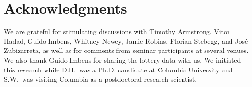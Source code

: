 \documentclass[aos,submission]{imsart}
\theoremstyle{plain}
\theoremstyle{remark}
\begin{document}
\section*{Acknowledgments}

We are grateful for stimulating
discussions with Timothy Armstrong, Vitor Hadad, Guido Imbens, Whitney Newey, Jamie Robins, Florian Stebegg, and Jos\'e Zubizarreta,
as well as for comments from seminar participants at several venues.
We also thank Guido Imbens for sharing the lottery data with us.
We initiated this research while D.H.~was a Ph.D. candidate at Columbia University and S.W.~was visiting Columbia as a postdoctoral research scientist.

\ifaos
\begin{supplement}
\end{supplement}
\fi

\ifaos

\else

\fi


\ifaos
\else

\newpage

\begin{appendix}

\end{appendix}

\fi
\end{document}
